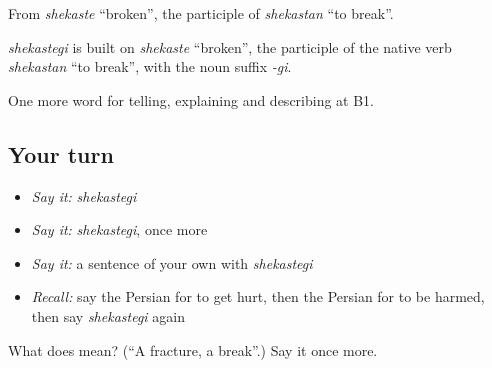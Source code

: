 From \emph{shekaste} \textquotedblleft{}broken\textquotedblright{}, the participle of \emph{shekastan} \textquotedblleft{}to break\textquotedblright{}.

\begin{cousinweb}
\emph{shekastegi} is built on \emph{shekaste} \textquotedblleft{}broken\textquotedblright{}, the participle of the native verb \emph{shekastan} \textquotedblleft{}to break\textquotedblright{}, with the noun suffix \emph{-gi}.
\end{cousinweb}

\begin{grammarlens}[title={What you've built}]
One more word for telling, explaining and describing at B1.
\end{grammarlens}

\subsection*{Your turn}
\begin{itemize}
\raggedright
  \item \emph{Say it:} \emph{shekastegi}
  \item \emph{Say it:} \emph{shekastegi}, once more
  \item \emph{Say it:} a sentence of your own with \emph{shekastegi}
  \item \emph{Recall:} say the Persian for to get hurt, then the Persian for to be harmed, then say \emph{shekastegi} again
\end{itemize}

\begin{tcolorbox}[breakable,colback=teal!4,colframe=teal!35!black,title={Before you move on}]
What does  mean? (\textquotedblleft{}A fracture, a break\textquotedblright{}.) Say it once more.
\end{tcolorbox}
